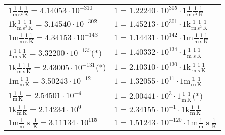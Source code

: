 \begin{center}
\begin{longtable}{l l}
{\color{black}$1 \bm{\mathrm{ }}\frac1{\operatorname{m}}\frac1{\operatorname{s}^2}{}\frac1{\operatorname{K}} = 4.14053\cdot10^{-310} $}   & {\color{black}$ 1 = 1.22240\cdot10^{305} \cdot 1 \bm{\mathrm{ }}\frac1{\operatorname{m}}\frac1{\operatorname{s}^2}{}\frac1{\operatorname{K}}$}  \\
{\color{gray}$1 \bm{\mathrm{ k}}\frac1{\operatorname{m}}\frac1{\operatorname{s}^2}{}\frac1{\operatorname{K}} = 3.14540\cdot10^{-302} $}   & {\color{gray}$ 1 = 1.45213\cdot10^{301} \cdot 1 \bm{\mathrm{ k}}\frac1{\operatorname{m}}\frac1{\operatorname{s}^2}{}\frac1{\operatorname{K}}$}  \\
{\color{gray}$1 \bm{\mathrm{ m}}\frac1{\operatorname{m}}\frac1{\operatorname{s}}{}\frac1{\operatorname{K}} = 4.34153\cdot10^{-143} $}   & {\color{gray}$ 1 = 1.14431\cdot10^{142} \cdot 1 \bm{\mathrm{ m}}\frac1{\operatorname{m}}\frac1{\operatorname{s}}{}\frac1{\operatorname{K}}$}  \\
{\color{black}$1 \bm{\mathrm{ }}\frac1{\operatorname{m}}\frac1{\operatorname{s}}{}\frac1{\operatorname{K}} = 3.32200\cdot10^{-135} $}\quad(*) & {\color{black}$ 1 = 1.40332\cdot10^{134} \cdot 1 \bm{\mathrm{ }}\frac1{\operatorname{m}}\frac1{\operatorname{s}}{}\frac1{\operatorname{K}}$}  \\
{\color{gray}$1 \bm{\mathrm{ k}}\frac1{\operatorname{m}}\frac1{\operatorname{s}}{}\frac1{\operatorname{K}} = 2.43005\cdot10^{-131} $}\quad(*) & {\color{gray}$ 1 = 2.10310\cdot10^{130} \cdot 1 \bm{\mathrm{ k}}\frac1{\operatorname{m}}\frac1{\operatorname{s}}{}\frac1{\operatorname{K}}$}  \\
{\color{gray}$1 \bm{\mathrm{ m}}\frac1{\operatorname{m}}{}{}\frac1{\operatorname{K}} = 3.50243\cdot10^{-12} $}   & {\color{gray}$ 1 = 1.32055\cdot10^{11} \cdot 1 \bm{\mathrm{ m}}\frac1{\operatorname{m}}{}{}\frac1{\operatorname{K}}$}  \\
{\color{black}$1 \bm{\mathrm{ }}\frac1{\operatorname{m}}{}{}\frac1{\operatorname{K}} = 2.54501\cdot10^{-4} $}   & {\color{black}$ 1 = 2.00441\cdot10^{3} \cdot 1 \bm{\mathrm{ }}\frac1{\operatorname{m}}{}{}\frac1{\operatorname{K}}$}\quad(*)\\
{\color{gray}$1 \bm{\mathrm{ k}}\frac1{\operatorname{m}}{}{}\frac1{\operatorname{K}} = 2.14234\cdot10^{0} $}   & {\color{gray}$ 1 = 2.34155\cdot10^{-1} \cdot 1 \bm{\mathrm{ k}}\frac1{\operatorname{m}}{}{}\frac1{\operatorname{K}}$}  \\
{\color{gray}$1 \bm{\mathrm{ m}}\frac1{\operatorname{m}}{\operatorname{s}}{}\frac1{\operatorname{K}} = 3.11134\cdot10^{115} $}   & {\color{gray}$ 1 = 1.51243\cdot10^{-120} \cdot 1 \bm{\mathrm{ m}}\frac1{\operatorname{m}}{\operatorname{s}}{}\frac1{\operatorname{K}}$}  \\

\end{longtable}
\end{center}
